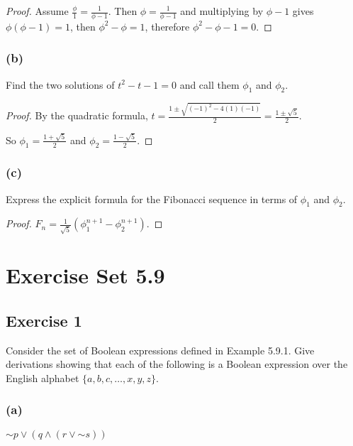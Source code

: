 \documentclass[14pt]{extarticle}
\newcommand{\dps}{\displaystyle}
\begin{document}
\begin{proof}
    Assume \(\frac{\phi}{1} = \frac{1}{\phi - 1}\). Then \(\phi = \frac{1}{\phi - 1}\) and multiplying by $\phi - 1$ gives
    \(\phi(\phi-1) = 1\), then \(\phi^2 - \phi = 1\), therefore \(\phi^2 - \phi - 1 = 0\).
\end{proof}

\subsubsection{(b)}
Find the two solutions of \(t^2 - t - 1 = 0\) and call them $\phi_1$ and $\phi_2$.

\begin{proof}
    By the quadratic formula, \(\dps t = \frac{1 \pm \sqrt{(-1)^2 - 4(1)(-1)}}{2} = \frac{1 \pm \sqrt{5}}{2}\).

    So \(\dps \phi_1 = \frac{1 + \sqrt{5}}{2}\) and \(\dps \phi_2 = \frac{1 - \sqrt{5}}{2}\).
\end{proof}

\subsubsection{(c)}
Express the explicit formula for the Fibonacci sequence in terms of $\phi_1$ and $\phi_2$.

\begin{proof}
    \(\dps F_n = \frac{1}{\sqrt{5}}(\phi_1^{n+1} - \phi_2^{n+1})\).
\end{proof}

\section{Exercise Set 5.9}

\subsection{Exercise 1}
Consider the set of Boolean expressions defined in Example 5.9.1. Give derivations showing that each of the following
is a Boolean expression over the English alphabet \(\{a, b, c, \ldots , x, y, z\}\).

\subsubsection{(a)}
\({\sim p} \vee (q \wedge (r \vee {\sim s}))\)
\end{document}
